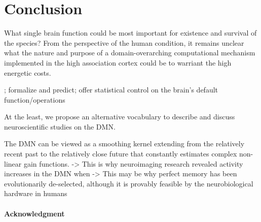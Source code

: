 \documentclass{article} %
\begin{document}
\section{Conclusion}
What single brain function could be most important for existence and survival of the species?
From the perspective of the human condition, it remains unclear what the nature and purpose of a domain-overarching computational mechanism implemented in the high association cortex could be to warriant the high energetic costs.

; formalize and predict; offer statistical control on the brain's default function/operations

At the least, we propose an alternative vocabulary to
describe and discuss neuroscientific studies on the DMN.

The DMN can be viewed as a smoothing kernel extending
from the relatively recent past to the relatively close future
that constantly estimates complex non-linear gain functions.
-> This is why neuroimaging research revealed activity increases in the DMN
when 
-> This may be why perfect memory has been evolutionarily de-selected,
although it is provably feasible by the neurobiological hardware in humans




\paragraph{Acknowledgment}


\small


\end{document}

